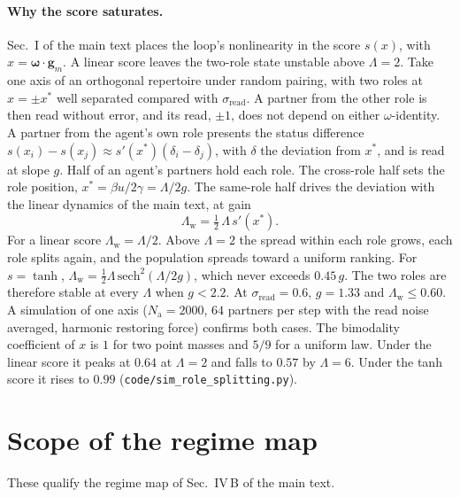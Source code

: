 \documentclass[
  aps,prx,
  preprint,
  superscriptaddress,
  nofootinbib
]{revtex4-2}
\newcommand{\w}{\bm{\omega}}
\newcommand{\g}{\mathbf{g}}
\newcommand{\sread}{\sigma_{\mathrm{read}}}
\newcommand{\gain}{g}
\newcommand{\Nag}{N_{\mathrm{a}}}
\begin{document}
\paragraph{Why the score saturates.} Sec.~I of the main text places the loop's nonlinearity in the score $s(x)$, with $x=\w\cdot\g_m$. A linear score leaves the two-role state unstable above $\Lambda=2$. Take one axis of an orthogonal repertoire under random pairing, with two roles at $x=\pm x^\ast$ well separated compared with $\sread$. A partner from the other role is then read without error, and its read, $\pm1$, does not depend on either $\omega$-identity. A partner from the agent's own role presents the status difference $s(x_i)-s(x_j)\approx s'(x^\ast)(\delta_i-\delta_j)$, with $\delta$ the deviation from $x^\ast$, and is read at slope $\gain$. Half of an agent's partners hold each role. The cross-role half sets the role position, $x^\ast=\beta u/2\gamma=\Lambda/2\gain$. The same-role half drives the deviation with the linear dynamics of the main text, at gain
\begin{equation*}
\Lambda_{\mathrm w}=\tfrac12\,\Lambda\,s'(x^\ast).
\end{equation*}
For a linear score $\Lambda_{\mathrm w}=\Lambda/2$. Above $\Lambda=2$ the spread within each role grows, each role splits again, and the population spreads toward a uniform ranking. For $s=\tanh$, $\Lambda_{\mathrm w}=\tfrac12\Lambda\,\mathrm{sech}^2(\Lambda/2\gain)$, which never exceeds $0.45\,\gain$. The two roles are therefore stable at every $\Lambda$ when $\gain<2.2$. At $\sread=0.6$, $\gain=1.33$ and $\Lambda_{\mathrm w}\le0.60$. A simulation of one axis ($\Nag=2000$, $64$ partners per step with the read noise averaged, harmonic restoring force) confirms both cases. The bimodality coefficient of $x$ is $1$ for two point masses and $5/9$ for a uniform law. Under the linear score it peaks at $0.64$ at $\Lambda=2$ and falls to $0.57$ by $\Lambda=6$. Under the tanh score it rises to $0.99$ (\texttt{code/sim\_role\_splitting.py}).

\bigskip
\section{Scope of the regime map}\label{sm:mapscope}

\noindent These qualify the regime map of Sec.~IV\,B of the main text.
\end{document}
